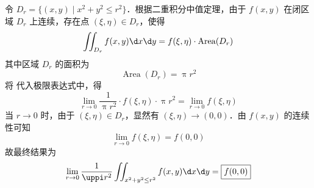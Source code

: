 \begin{solution}
    令 $D_r = \{ (x, y) \mid x^2 + y^2 \le r^2 \}$．根据二重积分中值定理，由于 $f(x, y)$ 在闭区域 $D_r$ 上连续，存在点 $(\xi, \eta) \in D_r$，使得
    \begin{equation}
        \iint_{D_r} f(x, y) \d x \d y = f(\xi, \eta) \cdot \operatorname{Area}(D_r) \label{eq:MVT}
    \end{equation}
    其中区域 $D_r$ 的面积为
    \begin{equation}
        \operatorname{Area}(D_r) = \uppi r^2
    \end{equation}
    将  代入极限表达式中，得
    \begin{equation}
        \lim_{r \to 0} \frac{1}{\uppi r^2} \cdot f(\xi, \eta) \cdot \uppi r^2 = \lim_{r \to 0} f(\xi, \eta)
    \end{equation}
    当 $r \to 0$ 时，由于 $(\xi, \eta) \in D_r$，显然有 $(\xi, \eta) \to (0, 0)$．由 $f(x, y)$ 的连续性可知
    \begin{equation}
        \lim_{r \to 0} f(\xi, \eta) = f(0, 0)
    \end{equation}
    故最终结果为
    \begin{equation}
        \lim_{r \to 0} \frac{1}{\uppi r^2} \iint_{x^2 + y^2 \le r^2} f(x, y) \d x \d y = \boxed{f(0, 0)}
    \end{equation}
\end{solution}

\endinput
